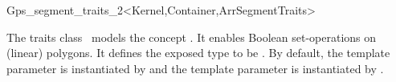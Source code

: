 \ccRefPageBegin

\begin{ccRefClass}{Gps_segment_traits_2<Kernel,Container,ArrSegmentTraits>}

\ccThreeToTwo

\ccDefinition
The traits class \ccRefName\ models the concept 
. It enables Boolean set-operations on 
(linear) polygons. It defines the exposed type  to be 
. By default, the template 
parameter  is instantiated by 
 and the template parameter
 is instantiated by 
.

 
\ccIsModel

\end{ccRefClass}
\ccRefPageEnd
